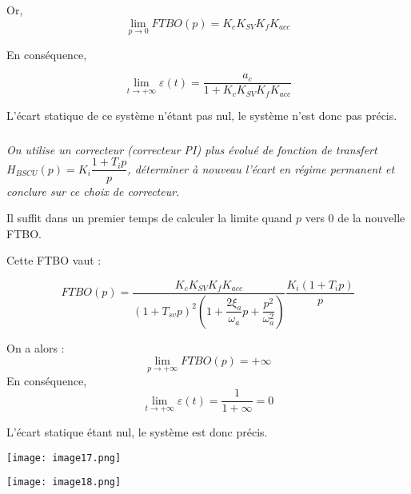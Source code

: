 \begin{multicols}{2}
\begin{corrige}
Or, 
$$
 \lim\limits_{p\to 0} FTBO(p) = K_cK_{SV}K_fK_{acc}
$$

En conséquence, 

$$
\lim\limits_{t\to +\infty} \varepsilon(t) = \dfrac{a_c}{1+K_cK_{SV}K_fK_{acc}}
$$

L'écart statique de ce système n'étant pas nul, le système n'est donc pas
précis.

\end{corrige}
\else
\fi


\subparagraph{}
\textit{On utilise un correcteur (correcteur PI) plus évolué de fonction de transfert
$H_{BSCU}(p)=K_i\dfrac{1+T_i p}{p}$, déterminer à nouveau l'écart en régime permanent et conclure sur ce choix de correcteur.}
\ifprof
\begin{corrige}

Il suffit dans un premier temps de calculer la limite quand $p$ vers 0 
de la nouvelle FTBO. 

Cette FTBO vaut :

$$
FTBO(p)=
\dfrac{K_cK_{SV}K_fK_{acc}}{\left( 1+T_{sv}p
\right)^2\left(1+\dfrac{2\xi_a}{\omega_a}p+\dfrac{p^2}{\omega_a^2}\right)}
\dfrac{K_i\left(1+T_i p\right)}{p}
$$

On a alors :
$$
\lim\limits_{p\to+\infty}FTBO(p)=+\infty
$$
En conséquence, 
$$
\lim\limits_{t\to +\infty} \varepsilon(t) = \dfrac{1}{1+\infty} = 0
$$

L'écart statique étant nul, le système est donc précis.

\end{corrige}
\else
\fi

\ifprof
\else
\begin{center}
\texttt{[image: image17.png]}
\end{center}

\begin{center}
\texttt{[image: image18.png]}
\end{center}
\fi






\end{multicols}
